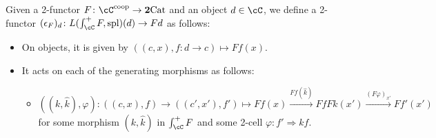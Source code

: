 \documentclass[11pt, dvipsnames]{amsart}
\begin{document}
\begin{constr}\label{constr.counit.split}
    Given a 2-functor $F\colon\cC^\coop\to\ttwocat$ and an object $d\in\cC$, we define a 2-functor $(\epsilon_F)_d\colon L(\int_\cC^+ F,\mathrm{spl})(d)\to Fd$ as follows:
    \begin{itemize}[leftmargin=*]
        \item On objects, it is given by $((c,x),f\colon d\to c)\mapsto Ff(x)$.
        \item It acts on each of the generating morphisms as follows:
        \begin{itemize}
            \item $((k,\widehat{k}),\varphi)\colon ((c,x),f)\to ((c',x'),f')\mapsto Ff(x)\xrightarrow{Ff(\widehat{k})} FfFk(x')\xrightarrow{(F\varphi)_{x'}} Ff'(x')$ for some morphism $(k,\widehat{k})$ in $\int_\cC^+ F$ and some 2-cell $\varphi\colon f'\Rightarrow kf$. 
            

\end{itemize}
\end{itemize}
\end{constr}
\end{document}

